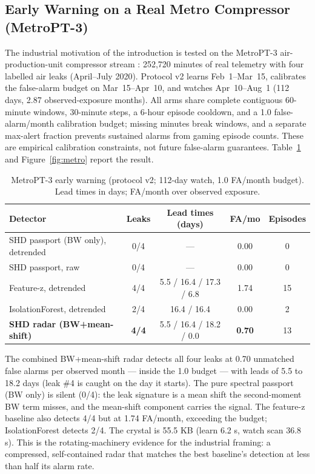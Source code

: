 \documentclass[11pt,a4paper]{article}
\begin{document}
\subsection{Early Warning on a Real Metro Compressor (MetroPT-3)}
\label{sec:metro}
The industrial motivation of the introduction is tested on the MetroPT-3 air-production-unit compressor stream \citep{veloso2022metropt}: 252,720 minutes of real telemetry with four labelled air leaks (April--July 2020). Protocol v2 learns Feb~1--Mar~15, calibrates the false-alarm budget on Mar~15--Apr~10, and watches Apr~10--Aug~1 (112 days, 2.87 observed-exposure months). All arms share complete contiguous 60-minute windows, 30-minute steps, a 6-hour episode cooldown, and a 1.0 false-alarm/month calibration budget; missing minutes break windows, and a separate max-alert fraction prevents sustained alarms from gaming episode counts. These are empirical calibration constraints, not future false-alarm guarantees. Table~\ref{tab:metro} and Figure~\ref{fig:metro} report the result.

\begin{table}[t]
\centering
\small
\caption{MetroPT-3 early warning (protocol v2; 112-day watch, 1.0 FA/month budget). Lead times in days; FA/month over observed exposure.}
\label{tab:metro}
\begin{tabular}{lcccc}
\toprule
\textbf{Detector} & \textbf{Leaks} & \textbf{Lead times (days)} & \textbf{FA/mo} & \textbf{Episodes} \\
\midrule
SHD passport (BW only), detrended & 0/4 & --- & 0.00 & 0 \\
SHD passport, raw & 0/4 & --- & 0.00 & 0 \\
Feature-z, detrended & 4/4 & 5.5 / 16.4 / 17.3 / 6.8 & 1.74 & 15 \\
IsolationForest, detrended & 2/4 & 16.4 / 16.4 & 0.00 & 2 \\
\textbf{SHD radar (BW+mean-shift)} & \textbf{4/4} & 5.5 / 16.4 / 18.2 / 0.0 & \textbf{0.70} & 13 \\
\bottomrule
\end{tabular}
\end{table}

The combined BW+mean-shift radar detects all four leaks at 0.70 unmatched false alarms per observed month --- inside the 1.0 budget --- with leads of 5.5 to 18.2 days (leak \#4 is caught on the day it starts). The pure spectral passport (BW only) is silent (0/4): the leak signature is a mean shift the second-moment BW term misses, and the mean-shift component carries the signal. The feature-z baseline also detects 4/4 but at 1.74 FA/month, exceeding the budget; IsolationForest detects 2/4. The crystal is 55.5 KB (learn 6.2 s, watch scan 36.8 s). This is the rotating-machinery evidence for the industrial framing: a compressed, self-contained radar that matches the best baseline's detection at less than half its alarm rate.
\end{document}
